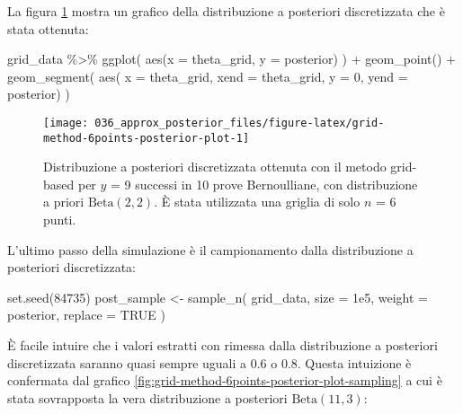 \documentclass[
]{memoir}
\newenvironment{Shaded}{\begin{snugshade}}{\end{snugshade}}
\newcommand{\AttributeTok}[1]{\textcolor[rgb]{0.77,0.63,0.00}{#1}}
\newcommand{\ConstantTok}[1]{\textcolor[rgb]{0.00,0.00,0.00}{#1}}
\newcommand{\DecValTok}[1]{\textcolor[rgb]{0.00,0.00,0.81}{#1}}
\newcommand{\FloatTok}[1]{\textcolor[rgb]{0.00,0.00,0.81}{#1}}
\newcommand{\FunctionTok}[1]{\textcolor[rgb]{0.00,0.00,0.00}{#1}}
\newcommand{\NormalTok}[1]{#1}
\newcommand{\OtherTok}[1]{\textcolor[rgb]{0.56,0.35,0.01}{#1}}
\newcommand{\SpecialCharTok}[1]{\textcolor[rgb]{0.00,0.00,0.00}{#1}}
\begin{document}
\noindent
La figura \ref{fig:grid-method-6points-posterior-plot} mostra un grafico della distribuzione a posteriori discretizzata che è stata ottenuta:

\begin{Shaded}
\begin{Highlighting}[]
\NormalTok{grid\_data }\SpecialCharTok{\%\textgreater{}\%} 
  \FunctionTok{ggplot}\NormalTok{(}
    \FunctionTok{aes}\NormalTok{(}\AttributeTok{x =}\NormalTok{ theta\_grid, }\AttributeTok{y =}\NormalTok{ posterior)}
\NormalTok{  ) }\SpecialCharTok{+}
  \FunctionTok{geom\_point}\NormalTok{() }\SpecialCharTok{+}
  \FunctionTok{geom\_segment}\NormalTok{(}
    \FunctionTok{aes}\NormalTok{(}
      \AttributeTok{x =}\NormalTok{ theta\_grid, }
      \AttributeTok{xend =}\NormalTok{ theta\_grid, }
      \AttributeTok{y =} \DecValTok{0}\NormalTok{, }
      \AttributeTok{yend =}\NormalTok{ posterior)}
\NormalTok{  )}
\end{Highlighting}
\end{Shaded}

\begin{figure}

{\centering \texttt{[image: 036\_approx\_posterior\_files/figure-latex/grid-method-6points-posterior-plot-1]} 

}

\caption{Distribuzione a posteriori discretizzata ottenuta con il metodo grid-based per $y$ = 9 successi in 10 prove Bernoulliane, con distribuzione a priori $\mbox{Beta}(2, 2)$. È stata utilizzata una griglia di solo $n$ = 6 punti.}\label{fig:grid-method-6points-posterior-plot}
\end{figure}

\noindent
L'ultimo passo della simulazione è il campionamento dalla distribuzione a posteriori discretizzata:

\begin{Shaded}
\begin{Highlighting}[]
\FunctionTok{set.seed}\NormalTok{(}\DecValTok{84735}\NormalTok{)}
\NormalTok{post\_sample }\OtherTok{\textless{}{-}} \FunctionTok{sample\_n}\NormalTok{(}
\NormalTok{  grid\_data,}
  \AttributeTok{size =} \FloatTok{1e5}\NormalTok{,}
  \AttributeTok{weight =}\NormalTok{ posterior,}
  \AttributeTok{replace =} \ConstantTok{TRUE}
\NormalTok{)}
\end{Highlighting}
\end{Shaded}

\noindent
È facile intuire che i valori estratti con rimessa dalla distribuzione a posteriori discretizzata saranno quasi sempre uguali a 0.6 o 0.8. Questa intuizione è confermata dal grafico \ref{fig:grid-method-6points-posterior-plot-sampling} a cui è stata sovrapposta la vera distribuzione a posteriori \(\mbox{Beta}(11, 3)\):
\end{document}
